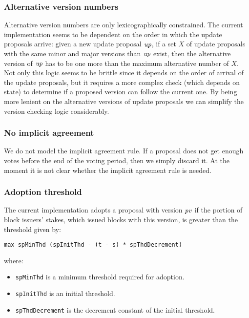\subsubsection{Alternative version numbers}
\label{sec:alt-version-numbers-constraints}

Alternative version numbers are only lexicographically constrained. The current
implementation seems to be dependent on the order in which the update proposals
arrive: given a new update proposal $\mathit{up}$, if a set $X$ of update
proposals with the same minor and major versions than $\mathit{up}$ exist, then
the alternative version of $\mathit{up}$ has to be one more than the maximum
alternative number of $X$. Not only this logic seems to be brittle since it
depends on the order of arrival of the update proposals, but it requires a more
complex check (which depends on state) to determine if a proposed version can
follow the current one. By being more lenient on the alternative versions of
update proposals we can simplify the version checking logic considerably.

\subsubsection{No implicit agreement}
\label{sec:no-implicit-agreement}

We do not model the implicit agreement rule. If a proposal does not get enough
votes before the end of the voting period, then we simply discard it. At the
moment it is not clear whether the implicit agreement rule is needed.

\subsubsection{Adoption threshold}
\label{sec:adoption-threshold}

The current implementation adopts a proposal with version $\mathit{pv}$ if the
portion of block issuers' stakes, which issued blocks with this version, is
greater than the threshold given by:

\begin{lstlisting}
max spMinThd (spInitThd - (t - s) * spThdDecrement)
\end{lstlisting}

where:
\begin{itemize}
\item \lstinline{spMinThd} is a minimum threshold required for adoption.
\item \lstinline{spInitThd} is an initial threshold.
\item \lstinline{spThdDecrement} is the decrement constant of the initial
  threshold.
\end{itemize}

